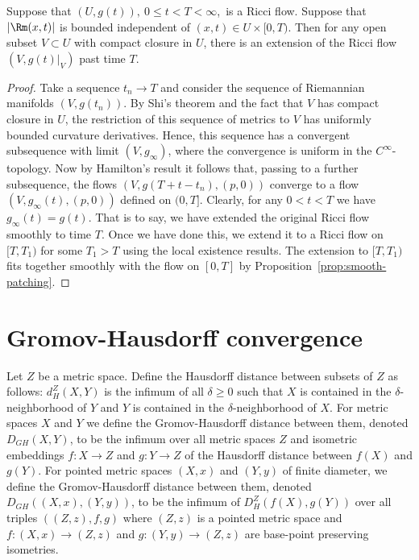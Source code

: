 \begin{corollary}\label{cor:ricci-flow-extension-bounded-curvature}
\notready

Suppose that $(U,g(t)),\ 0\le t<T<\infty$,\ is a Ricci flow. Suppose
that $|\Rm(x,t)|$ is bounded independent of $(x,t)\in U\times
[0,T)$. Then for any open subset $V\subset U$ with compact closure
in $U$, there is an extension of the Ricci flow $(V,g(t)|_V)$ past
time $T$.
\end{corollary}

\begin{proof}
\sketch
{}
 Take a sequence $t_n\rightarrow T$ and consider the
sequence of Riemannian manifolds $(V,g(t_n))$. By Shi's theorem and the fact
that $V$ has compact closure in $U$, the restriction of this sequence of
metrics to $V$ has uniformly bounded curvature derivatives. Hence, this
sequence has a convergent subsequence with limit $(V,g_\infty)$, where the
convergence is uniform in the $C^\infty$-topology. Now by Hamilton's result
\cite{Hamiltonlimits} it follows that, passing to a further subsequence, the
flows $(V,g(T+t-t_n),(p,0))$ converge to a flow $(V,g_\infty(t),(p,0))$ defined
on $(0,T]$. Clearly, for any $0<t<T$ we have $g_\infty(t)=g(t)$. That is to
say, we have extended the original Ricci flow smoothly to time $T$. Once we
have done this, we extend it to a Ricci flow on $[T,T_1)$ for some $T_1> T$
using the local existence results. The extension to $[T,T_1)$ fits together
smoothly with the flow on $[0,T]$ by Proposition~\ref{prop:smooth-patching}.
\end{proof}




\section{Gromov-Hausdorff convergence}

Let $Z$ be a metric space. Define the
Hausdorff distance between subsets of $Z$ as follows: $d^Z_H(X,Y)$ is the
infimum of all $\delta\ge 0$ such that $X$ is contained in the
$\delta$-neighborhood of $Y$ and $Y$ is contained in the $\delta$-neighborhood
of $X$. For metric spaces $X$ and $Y$ we define the Gromov-Hausdorff distance
between them, denoted $D_{GH}(X,Y)$, to be the infimum over all metric spaces
$Z$ and isometric embeddings $f\colon X\to Z$ and $g\colon Y\to Z$ of the
Hausdorff distance between $f(X)$ and $g(Y)$. For pointed metric spaces $(X,x)$
and $(Y,y)$ of finite diameter, we define the Gromov-Hausdorff
distance between them, denoted
$D_{GH}((X,x),(Y,y))$, to be the infimum of $D_H^Z(f(X),g(Y))$ over all triples
$((Z,z),f,g)$ where $(Z,z)$ is a pointed metric space and $f\colon (X,x)\to
(Z,z)$ and $g\colon (Y,y)\to (Z,z)$ are base-point preserving isometries.



